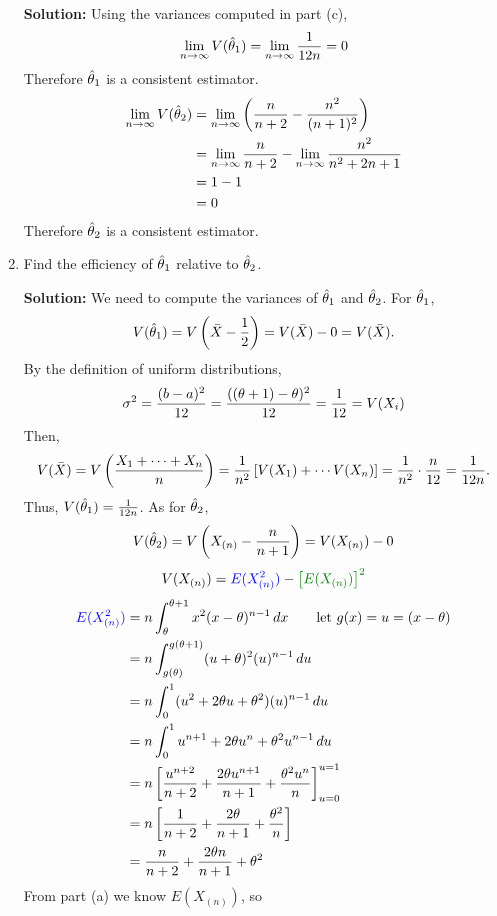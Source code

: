 \begin{enumerate}[label=({\alph*})]
    \nl \textbf{Solution: } Using the variances computed in part (c),
    $$\limn V(\that_1) = \limn \over{12n} = 0$$
    Therefore $\that_1$ is a consistent estimator.
    \begin{align*}
        \limn V(\that_2) &= \limn \pars{\frac{n}{n+2}- \frac{n^2}{(n+1)^2}}\\
        &= \limn \frac{n}{n+2} - \limn\frac{n^2}{n^2+2n+1}\\
        &= 1 - 1\\&= 0
    \end{align*}
    Therefore $\that_2$ is a consistent estimator.
    \newpage
    \item Find the efficiency of $\that_1$ relative to $\that_2$.
        
    \nl \textbf{Solution: } We need to compute the variances of $\that_1$ and $\that_2$. For $\that_1$,
        $$V(\that_1) = V\pars{\xbar - \over{2}} = V(\xbar) - 0 = V(\xbar).$$
        By the definition of uniform distributions, $$\sigma^2 = \frac{(b-a)^2}{12} = \frac{((\theta+1) - \theta)^2}{12} = \over{12} = V(X_i)$$
        Then,
        $$V(\xbar) = V\pars{\frac{\sumthru{X}}{n}} = \over{n^2} \brac{ V(X_1) + \cdots V(X_n) } = \over{n^2} \cdot  \frac{n}{12} = \over{12n}.$$
        Thus, $V(\that_1) = \over{12n}$. As for $\that_2$,
        $$V(\that_2) = V \pars{X_{(n)} - \frac{n}{n+1}} = V(X_{(n)}) - 0$$
        $$V(X_{(n)}) = \blu{E(X_{(n)}^2)} - \grn{\big[E(X_{(n)}) \big]^2}$$
        \begin{align*}
            \blu{E(X_{(n)}^2)} &= n \int_{\theta}^{\theta+1} x^2 (x - \theta)^{n-1}\,dx \qquad \text{let } g(x) = u = (x - \theta)\\
            &= n \int_{g(\theta)}^{g(\theta+1)} (u + \theta)^2 (u)^{n-1}\,du\\
            &= n \int_{0}^{1} (u^2 + 2\theta u + \theta^2) (u)^{n-1}\,du\\
            &= n \int_{0}^{1} u^{n+1} + 2\theta u^{n} + \theta^2u^{n-1}\,du\\
            &= n \brac{\frac{u^{n+2}}{n+2} + \frac{2\theta u^{n+1}}{n+1} + \frac{\theta^2 u^n}{n} }_{u = 0}^{u = 1}\\
            &= n \brac{ \frac{1}{n+2} + \frac{2\theta}{n+1} + \frac{\theta^2}{n}  }\\
            &= \frac{n}{n+2} + \frac{2\theta n}{n+1} + \theta^2\\
        \end{align*}
        From part (a) we know $E(X_{(n)})$, so
        \begin{align*}

\end{align*}
\end{enumerate}

